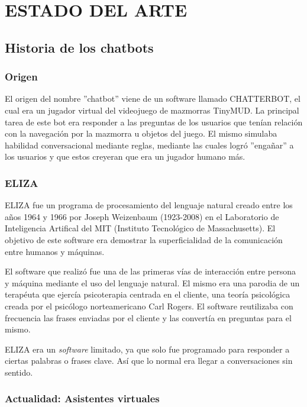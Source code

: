 \documentclass[spanish,12pt, a4paper, twoside]{paper}
\let\oldsection\section
\def\section{\cleardoublepage\oldsection}
\begin{document}
\section{ESTADO DEL ARTE}

\subsection{Historia de los chatbots}

\subsubsection{Origen}

El origen del nombre ''chatbot'' viene de un software llamado CHATTERBOT, el cual era un jugador virtual del videojuego de mazmorras TinyMUD. La principal tarea de este bot era responder a las preguntas de los usuarios que tenían relación con la navegación por la mazmorra u objetos del juego. El mismo simulaba habilidad conversacional mediante reglas, mediante las cuales logró ''engañar'' a los usuarios y que estos creyeran que era un jugador humano más. \cite[pág. 2]{CANLI}

\subsubsection{ELIZA}
ELIZA fue un programa de procesamiento del lenguaje natural creado entre los años 1964 y 1966 por Joseph Weizenbaum (1923-2008) en el Laboratorio de Inteligencia Artifical del MIT (Instituto Tecnológico de Massachusetts). El objetivo de este software era demostrar la superficialidad de la comunicación entre humanos y máquinas.
\newline

El software que realizó fue una de las primeras vías de interacción entre persona y máquina mediante el uso del lenguaje natural. El mismo era una parodia de un terapéuta que ejercía psicoterapia centrada en el cliente, una teoría psicológica creada por el psicólogo norteamericano Carl Rogers. El software reutilizaba con frecuencia las frases enviadas por el cliente y las convertía en preguntas para el mismo.
\newline

ELIZA era un \emph{software} limitado, ya que solo fue programado para responder a ciertas palabras o frases clave. Así que lo normal era llegar a conversaciones sin sentido.

\subsubsection{Actualidad: Asistentes virtuales}
\end{document}
